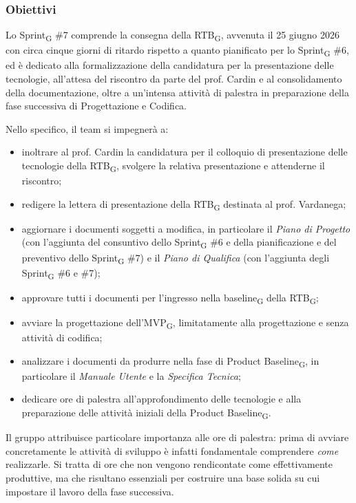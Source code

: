 \documentclass[a4paper, 10pt, colorlinks=true, linkcolor=black, urlcolor=blue, citecolor=blue, hidelinks]{article}
\begin{document}
\subsubsection{Obiettivi}
Lo Sprint\textsubscript{G} \#7 comprende la consegna della RTB\textsubscript{G}, avvenuta il 25 giugno 2026 con circa cinque giorni di ritardo rispetto a quanto pianificato per lo Sprint\textsubscript{G} \#6, ed è dedicato alla formalizzazione della candidatura per la presentazione delle tecnologie, all'attesa del riscontro da parte del prof. Cardin e al consolidamento della documentazione, oltre a un'intensa attività di palestra in preparazione della fase successiva di Progettazione e Codifica.

Nello specifico, il team si impegnerà a:
\begin{itemize}
    \item inoltrare al prof. Cardin la candidatura per il colloquio di presentazione delle tecnologie della RTB\textsubscript{G}, svolgere la relativa presentazione e attenderne il riscontro;
    \item redigere la lettera di presentazione della RTB\textsubscript{G} destinata al prof. Vardanega;
    \item aggiornare i documenti soggetti a modifica, in particolare il \textit{Piano di Progetto} (con l'aggiunta del consuntivo dello Sprint\textsubscript{G} \#6 e della pianificazione e del preventivo dello Sprint\textsubscript{G} \#7) e il \textit{Piano di Qualifica} (con l'aggiunta degli Sprint\textsubscript{G} \#6 e \#7);
    \item approvare tutti i documenti per l'ingresso nella baseline\textsubscript{G} della RTB\textsubscript{G};
    \item avviare la progettazione dell'MVP\textsubscript{G}, limitatamente alla progettazione e senza attività di codifica;
    \item analizzare i documenti da produrre nella fase di Product Baseline\textsubscript{G}, in particolare il \textit{Manuale Utente} e la \textit{Specifica Tecnica};
    \item dedicare ore di palestra all'approfondimento delle tecnologie e alla preparazione delle attività iniziali della Product Baseline\textsubscript{G}.
\end{itemize}

Il gruppo attribuisce particolare importanza alle ore di palestra: prima di avviare concretamente le attività di sviluppo è infatti fondamentale comprendere \textit{come} realizzarle. Si tratta di ore che non vengono rendicontate come effettivamente produttive, ma che risultano essenziali per costruire una base solida su cui impostare il lavoro della fase successiva.
\end{document}
